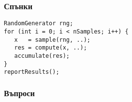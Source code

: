 
\begin{frame}[fragile]
\frametitle{Спънки}
\pause
\begin{lstlisting}
RandomGenerator rng;
for (int i = 0; i < nSamples; i++) {
   x   = sample(rng, ..);
   res = compute(x, ..);
   accumulate(res);
}
reportResults();
\end{lstlisting}
\end{frame}

\begin{frame}
  \frametitle{Въпроси} \pause
     
\end{frame}
